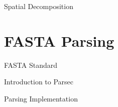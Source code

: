 \documentclass{beamer}
\begin{document}
\begin{frame}{Spatial Decomposition}
    
\end{frame}

\section{FASTA Parsing}

\begin{frame}{FASTA Standard}
    
\end{frame}

\begin{frame}{Introduction to Parsec}
    
\end{frame}


\begin{frame}{Parsing Implementation}
    
\end{frame}
\end{document}
